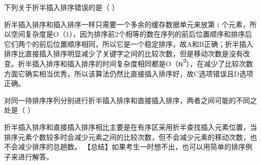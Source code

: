 \question 下列关于折半插入排序错误的是（ ）
\par{}
\begin{solution}折半插入排序和插入排序一样只需要一个多余的缓存数据单元来放第 i
个元素，所以空间复杂度是O（1），因为排序前2个相等的数在序列的前后位置顺序和排序后它们两个的前后位置顺序相同，所以它是一个稳定排序，故A和B正确；折半插入排序比直接插入排序明显减少了关键字之间的比较次数，但是移动次数是没有改变。折半插入排序和插入排序的时间复杂度相同都是O（\includegraphics[width=0.16667in,height=0.15625in]{texmath/071fa15Cdpi7B3507Dn5E2}），在减少了比较次数方面它确实相当优秀，所以该算法仍然比直接插入排序好，故C选项错误且D选项正确。
\end{solution}
\question 对同一待排序序列分别进行折半插入排序和直接插入排序，两者之间可能的不同之处是（
）
\par{}
\begin{solution}折半插入排序和直接插入排序相比主要是在有序区采用折半查找插入元素位置，当排序元素个数较多时会减少元素之间的比较次数，但不会减少元素的移动次数，也不会减少排序的总趟数。
【总结】如果考生一时想不出，也可以用简单的排序例子来进行解答。
\end{solution}

